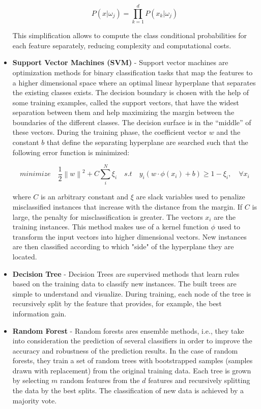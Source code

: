 \begin{itemize}
\[ P(x|\omega_j) = \prod_{k=1}^{d} P(x_k|\omega_j) \]

This simplification allows to compute the class conditional probabilities for each feature separately, reducing complexity and computational costs. 

\item \textbf{Support Vector Machines (SVM)} -  Support vector machines \citep{vapnik1995svm} are optimization methods for binary classification tasks that map the features to a higher dimensional space where an optimal linear hyperplane that separates the existing classes exists. The decision boundary is chosen with the help of some training examples, called the support vectors, that have the widest separation between them and help maximizing the margin between the boundaries of the different classes. The decision surface is in the ``middle'' of these vectors. 
During the training phase, the coefficient vector $w$ and the constant $b$ that define the separating hyperplane are searched such that the following error function is minimized: 

\[ minimize \quad \frac{1}{2} \left \| w \right \|^{2} + C  \sum_{i}^{N} \xi_i \quad s.t  \quad y_i(w \cdot \phi (x_i) + b) \geq 1 - \xi_i  ,\quad \forall x_i \]

where $C$ is an arbitrary constant and $\xi$ are slack variables used to penalize misclassified instances that increase with the distance from the margin. If $C$ is large, the penalty for misclassification is greater. The vectors $x_i$ are the training instances. This method makes use of a kernel function $\phi$ used to transform the input vectors into higher dimensional vectors. New instances are then classified according to which "side" of the hyperplane they are located.

\item \textbf{Decision Tree} - Decision Trees are supervised methods that learn rules based on the training data to classify new instances. The built trees are simple to understand and visualize. During training, each node of the tree is recursively split by the feature that provides, for example, the best information gain.  

\item \textbf{Random Forest} - Random forests ares ensemble methods, i.e., they take into consideration the prediction of several classifiers in order to improve the accuracy and robustness of the prediction results. In the case of random forests, they train a set of random trees with bootstrapped samples (samples drawn with replacement) from the original training data. Each tree is grown by selecting $m$ random features  from the $d$ features and recursively splitting the data by the best splits. The classification of new data is achieved by a majority vote.
\end{itemize}

